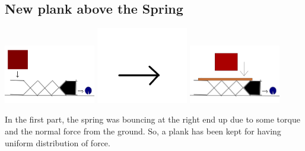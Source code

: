 \documentclass[11pt]{article}
\begin{document}
\subsection{New plank above the Spring}
\begin{center}
 \includegraphics[width=0.3\textwidth,keepaspectratio]{img/spring_old.png}
 \includegraphics[width=0.3\textwidth,keepaspectratio]{img/arrow.png}
 \includegraphics[width=0.3\textwidth,keepaspectratio]{img/spring_new.png}
\end{center}
	In the first part, the spring was bouncing at the right end up due to some torque and the normal force from the ground.
	So, a plank has been kept for having uniform distribution of force.
\end{document}
